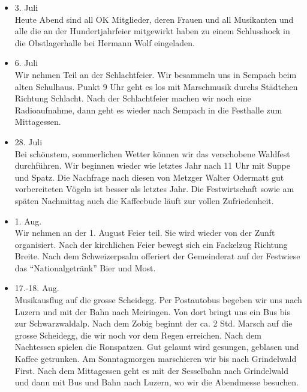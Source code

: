 \begin{history}
\begin{itemize}
        \item[]3. Juli\\
        Heute Abend sind all OK Mitglieder, deren Frauen und all Musikanten und
        alle die an der Hundertjahrfeier mitgewirkt haben zu einem Schlusshock
        in die Obstlagerhalle bei Hermann Wolf eingeladen.

        \item[]6. Juli\\
        Wir nehmen Teil an der Schlachtfeier. Wir besammeln uns in Sempach beim
        alten Schulhaus. Punkt 9 Uhr geht es los mit Marschmusik durchs
        Städtchen Richtung Schlacht. Nach der Schlachtfeier machen wir noch eine
        Radioaufnahme, dann geht es wieder nach Sempach in die Festhalle zum
        Mittagessen.

        \item[]28. Juli\\
        Bei schönstem, sommerlichen Wetter können wir das verschobene Waldfest
        durchführen. Wir beginnen wieder wie letztes Jahr nach 11 Uhr mit Suppe
        und Spatz. Die Nachfrage nach diesen von Metzger Walter Odermatt gut
        vorbereiteten Vögeln ist besser als letztes Jahr. Die Festwirtschaft
        sowie am späten Nachmittag auch die Kaffeebude läuft zur vollen
        Zufriedenheit.

        \item[]1. Aug.\\
        Wir nehmen an der 1. August Feier teil. Sie wird wieder von der Zunft
        organisiert. Nach der kirchlichen Feier bewegt sich ein Fackelzug
        Richtung Breite. Nach dem Schweizerpsalm offeriert der Gemeinderat auf
        der Festwiese das \enquote{Nationalgetränk} Bier und Most.

        \item[]17.-18. Aug.\\
        Musikausflug auf die grosse Scheidegg. Per Postautobus begeben wir uns
        nach Luzern und mit der Bahn nach Meiringen. Von dort bringt uns ein Bus
        bis zur Schwarzwaldalp. Nach dem Zobig beginnt der ca. 2 Std. Marsch auf
        die grosse Scheidegg, die wir noch vor dem Regen erreichen. Nach dem
        Nachtessen spielen die Ronspatzen. Gut gelaunt wird gesungen, geblasen
        und Kaffee getrunken. Am Sonntagmorgen marschieren wir bis nach
        Grindelwald First. Nach dem Mittagessen geht es mit der Sesselbahn nach
        Grindelwald und dann mit Bus und Bahn nach Luzern, wo wir die Abendmesse
        besuchen.


\end{itemize}
\end{history}
